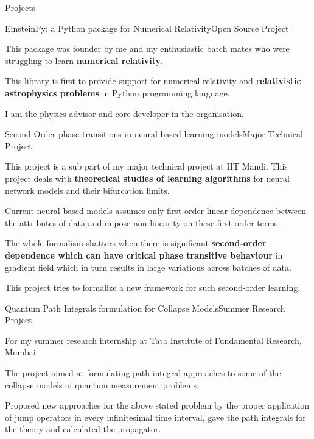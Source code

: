 \documentclass{resume} %
\begin{document}
\begin{rSection}{Projects}
\begin{rSubsection}{EinsteinPy: a Python package for Numerical Relativity}{Open Source Project}{}{}
\item This package was founder by me and my enthusiastic batch mates who were struggling to learn \textbf{numerical relativity}.
\item This library is first to provide support for numerical relativity and \textbf{relativistic astrophysics problems} in Python programming language.
\item I am the physics advisor and core developer in the organisation.

\end{rSubsection}
\newpage
\begin{rSubsection}{Second-Order phase transitions in neural based learning models}{Major Technical Project}{}{}
    \item This project is a sub part of my major technical project at IIT Mandi. This project deals with \textbf{theoretical studies of learning algorithms} for neural network models and their bifurcation limits.
    \item Current neural based models assumes only first-order linear dependence between the attributes of data and impose non-linearity on these first-order terms.
    \item The whole formalism shatters when there is significant \textbf{second-order dependence which can have critical phase transitive behaviour} in gradient field which in turn results in large variations across batches of data.
    \item This project tries to formalize a new framework for such second-order learning.
\end{rSubsection}

\begin{rSubsection}{Quantum Path Integrals formulation for Collapse Models}{Summer Research Project}{}{}
\item For my summer research internship at Tata Institute of Fundamental Research, Mumbai.
    \item The project aimed at formulating path integral approaches to some of the collapse models of quantum measurement problems.
    \item Proposed new approaches for the above stated problem by the proper application of jump operators in every infinitesimal time interval, gave the path integrals for the theory and calculated the propagator.
\end{rSubsection}

\end{rSection}
\end{document}
